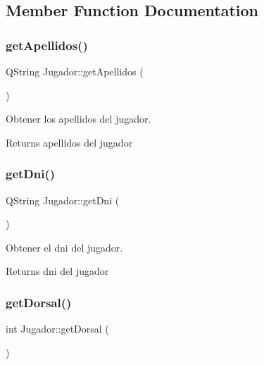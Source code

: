 \subsection{Member Function Documentation}
\mbox{\label{classJugador_aba79aff8e870ffe04bf5a4ffd94f5e5d}} 
\subsubsection{\texorpdfstring{get\+Apellidos()}{getApellidos()}}
{\footnotesize\ttfamily Q\+String Jugador\+::get\+Apellidos (\begin{DoxyParamCaption}{ }\end{DoxyParamCaption})}



Obtener los apellidos del jugador. 

\begin{DoxyReturn}{Returns}
apellidos del jugador 
\end{DoxyReturn}
\mbox{\label{classJugador_abd65250f237f645c3f926e879b4740dd}} 
\subsubsection{\texorpdfstring{get\+Dni()}{getDni()}}
{\footnotesize\ttfamily Q\+String Jugador\+::get\+Dni (\begin{DoxyParamCaption}{ }\end{DoxyParamCaption})}



Obtener el dni del jugador. 

\begin{DoxyReturn}{Returns}
dni del jugador 
\end{DoxyReturn}
\mbox{\label{classJugador_a7f67a27c34f24e618cdbfbebf29b8704}} 
\subsubsection{\texorpdfstring{get\+Dorsal()}{getDorsal()}}
{\footnotesize\ttfamily int Jugador\+::get\+Dorsal (\begin{DoxyParamCaption}{ }\end{DoxyParamCaption})}



